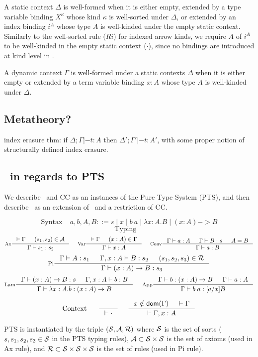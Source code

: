 A static context $\Delta$ is well-formed when it is either empty, extended by
a type variable binding $X^\kappa$ whose kind $\kappa$ is well-sorted
under $\Delta$, or extended by an index binding $i^A$ whose type $A$ is
well-kinded under the empty static context. Similarly to the well-sorted rule
($Ri$) for indexed arrow kinds, we require $A$ of $i^A$ to be well-kinded in
the empty static context ($\cdot$), since no bindings are introduced
at kind level in \Fi.

A dynamic context $\Gamma$ is well-formed under a static contexts $\Delta$
when it is either empty or extended by a term variable binding $x:A$ whose
type $A$ is well-kinded under $\Delta$.


\subsection{Metatheory?}


index erasure thm:
if $\Delta;\Gamma |- t : A$ then $\Delta';\Gamma' |- t : A'$,
with some proper notion of structurally defined index erasure.

\subsection{\Fi\ in regards to PTS}
We describe \Fw\ and CC as an instances of the Pure Type System (PTS),
and then describe \Fi\ as an extension of \Fw\ and a restriction of CC.

\[\text{Syntax}~~~~~ a,b,A,B ::= s \mid x \mid b~a \mid \lambda x:A.B
                                   \mid (x:A) -> B \]
\[\text{Typing}~~~~~\]
\[
 \inference[Ax]{|-\Gamma & (s_1,s_2)\in\calA}{\Gamma |- s_1 : s_2}
 ~~~~
 \inference[Var]{|-\Gamma & (x:A)\in\Gamma}{\Gamma |- x:A} 
 ~~~~
 \inference[Conv]{\Gamma |- a:A & \Gamma |- B:s & A=B}{\Gamma |- a:B}
\]
\[
 \inference[Pi]{\Gamma |- A:s_1 & \Gamma,x:A |- B:s_2 & (s_1,s_2,s_3)\in\calR}
               {\Gamma |- (x:A)-> B : s_3}
\]
\[
 \inference[Lam]{\Gamma |- (x:A)-> B : s & \Gamma,x:A |- b:B}
                {\Gamma |- \lambda x:A.b : (x:A)-> B}
 ~~~~
 \inference[App]{\Gamma |- b:(x:A)-> B & \Gamma |- a:A}{\Gamma |- b\;a:[a/x]B}
\]

\[\text{Context}~~~~~
 \inference{}{|-\cdot}
 ~~~~
 \inference{x\notin\dom(\Gamma) & |-\Gamma}{|-\Gamma,x:A}
\]

PTS is instantiated by the triple $(\mathcal{S},\mathcal{A},\mathcal{R})$ where
$\mathcal{S}$ is the set of sorts ($s,s_1,s_2,s_3\in\mathcal{S}$ in the PTS typing rules),
$\mathcal{A}\subset\mathcal{S}\times\mathcal{S}$ is the set of axioms (used in Ax rule), and
$\mathcal{R}\subset\mathcal{S}\times\mathcal{S}\times\mathcal{S}$ is the set of rules (used in Pi rule).

